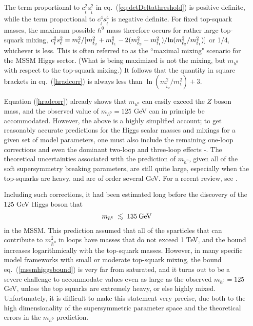 \documentclass[12pt]{article}
\def\beq{\begin{eqnarray}}
\def\eeq{\end{eqnarray}}
\def\centeron#1#2{{\setbox0=\hbox{#1}\setbox1=\hbox{#2}\ifdim
\wd1>\wd0\kern.5\wd1\kern-.5\wd0\fi
\copy0\kern-.5\wd0\kern-.5\wd1\copy1\ifdim\wd0>\wd1
\kern.5\wd0\kern-.5\wd1\fi}}
\def\ltap{\;\centeron{\raise.35ex\hbox{$<$}}{\lower.65ex\hbox{$\sim$}}\;}
\def\lsim{\mathrel{\ltap}}
\begin{document}
The term proportional to $c_{\tilde t}^2 s_{\tilde t}^2$ 
in eq.~(\ref{eq:detDeltathreshold}) is positive definite, 
while the term proportional to $c_{\tilde t}^4 s_{\tilde t}^4$ is negative definite. 
For fixed top-squark masses, the maximum possible $h^0$ mass therefore
occurs for rather large top-squark mixing, 
$c_{\tilde t}^2 s_{\tilde t}^2  = m_t^2/[m_{\tilde t_2}^2 + m_{\tilde t_1}^2
- 2 (m_{\tilde t_2}^2 - m_{\tilde t_1}^2)/{\rm ln}(m_{\tilde t_2}^2/m_{\tilde t_1}^2)
]$ or 1/4, whichever is less. This is often referred to as the ``maximal mixing" 
scenario for the MSSM Higgs sector. (What is being maximized 
is not the mixing, but $m_{h^0}$ with respect to the top-squark mixing.) 
It follows that the quantity in 
square brackets in eq.~(\ref{hradcorr}) is always less than 
$\ln(m_{\tilde t_2}^2/m_t^2) + 3$.

Equation (\ref{hradcorr}) already shows that $m_{h^0}$ 
can easily exceed the $Z$ boson mass, and the 
observed value of $m_{h^0} = 125$ GeV can in principle be accommodated. However, 
the above is a highly simplified account; to get reasonably accurate predictions for the Higgs scalar masses and mixings
for a given set of model parameters, one must also include
the remaining one-loop corrections and even the dominant two-loop and three-loop
effects
\cite{hcorrections}-\cite{Vega:2015fna}.
The theoretical 
uncertainties associated with the prediction of $m_{h^0}$, given all of the 
soft supersymmetry breaking parameters, are still quite large, especially
when the top-squarks are heavy, and are of order several GeV.
For a recent review, see \cite{DraperRzehak}.

Including such corrections, it had been estimated long
before the discovery of the 125 GeV Higgs boson that 
\beq
m_{h^0} \lsim 135\>{\rm GeV}
\label{mssmhiggsbound}
\eeq
in the MSSM. This prediction assumed that all of the sparticles that can contribute 
to $m_{h^0}^2$ in loops have masses that do not exceed 1 TeV, 
and the bound increases logarithmically with the top-squark masses. 
However, in many specific model
frameworks with small or moderate top-squark mixing,
the bound eq.~(\ref{mssmhiggsbound}) is very far from saturated, and 
it turns out to be a severe challenge to accommodate values even as large as the observed 
$m_{h^0} = 125$ GeV, unless the top squarks are extremely heavy, or else highly mixed. 
Unfortunately, it is difficult to make this statement very 
precise, due both to the high dimensionality of the 
supersymmetric parameter space and the theoretical errors in the $m_{h^0}$ prediction.
\end{document}
